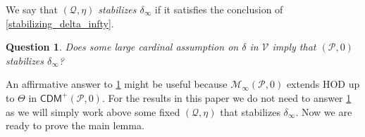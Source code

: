 \documentclass{amsart}
\newtheorem{ques}[dfn]{Question}
\begin{document}
We say that \emph{$(\mathcal{Q}, \eta)$ stabilizes $\delta_{\infty}$} if it satisfies the conclusion of \cref{stabilizing_delta_infty}.

\begin{ques}\label{ques_on_stabilizing_delta_infty}
Does some large cardinal assumption on $\delta$ in $\mathcal{V}$ imply that $(\mathcal{P}, 0)$ stabilizes $\delta_{\infty}$?
\end{ques}

An affirmative answer to \cref{ques_on_stabilizing_delta_infty} might be useful because $\mathcal{M}_{\infty}(\mathcal{P}, 0)$ extends $\mathrm{HOD}$ up to $\Theta$ in $\mathsf{CDM}^+(\mathcal{P}, 0)$.
For the results in this paper we do not need to answer \cref{ques_on_stabilizing_delta_infty} as we will simply work above some fixed $(\mathcal{Q}, \eta)$ that stabilizes $\delta_{\infty}$.
Now we are ready to prove the main lemma.
\end{document}
